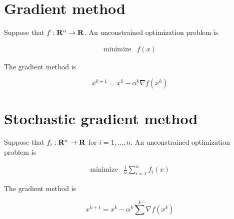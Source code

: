 
\section{Gradient method}


Suppose that $f:\mathbf{R}^n\to\mathbf{R}$. An unconstrained optimization problem is

\begin{equation}
\begin{array}{ll}
\mbox{minimize} & f(x)
\end{array}
\end{equation}

The gradient method is

\begin{equation}
x^{k+1} = x^{k} - \alpha^k \nabla f(x^k)
\end{equation}


\section{Stochastic gradient method}


Suppose that $f_i:\mathbf{R}^n\to\mathbf{R}$ for $i=1,\ldots,n$. An unconstrained optimization problem is

\begin{equation}
\begin{array}{ll}
\mbox{minimize} & \frac{1}{n} \sum_{i=1}^n f_i(x)
\end{array}
\end{equation}

The gradient method is

\begin{equation}
x^{k+1} = x^{k} - \alpha^k \sum_{}^k \nabla f(x^k)
\end{equation}

